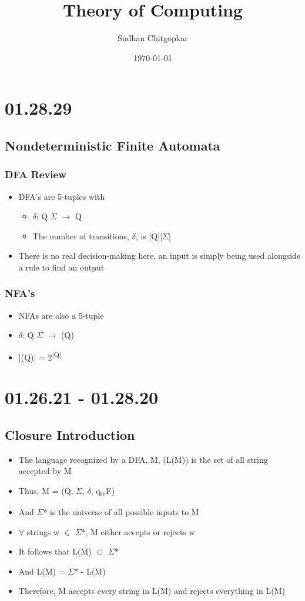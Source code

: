 \documentclass[11pt]{article}
\author{Sudhan Chitgopkar}
\date{\today}
\title{Theory of Computing}
\begin{document}
\maketitle
\tableofcontents \clearpage\section{01.28.29}
\label{sec:org62ebc56}
\subsection{Nondeterministic Finite Automata}
\label{sec:org2fa3076}
\subsubsection{DFA Review}
\label{sec:org348117a}
\begin{itemize}
\item DFA's are 5-tuples with
\begin{itemize}
\item \(\delta\): Q \texttimes{} \(\Sigma\) \(\to\) Q
\item The number of transitions, \(\delta\), is |Q||\(\Sigma\)|
\end{itemize}
\item There is no real decision-making here, an input is simply being used alongside a rule to find an output
\end{itemize}
\subsubsection{NFA's}
\label{sec:org0b276a4}
\begin{itemize}
\item NFAs are also a 5-tuple
\item \(\delta\): Q \texttimes{} \(\Sigma\) \(\to\) (Q)
\item |(Q)| = 2\textsuperscript{|Q|}
\end{itemize}
\section{01.26.21 - 01.28.20}
\label{sec:org1d8a6a3}
\subsection{Closure Introduction}
\label{sec:orgab49c93}
\begin{itemize}
\item The language recognized by a DFA, M, (L(M)) is the set of all string accepted by M
\item Thus, M = (Q, \(\Sigma\), \(\delta\), q\textsubscript{0},F)
\item And \(\Sigma\)* is the universe of all possible inputs to M
\item \(\forall\) strings w \(\in\) \(\Sigma\)*, M either accepts or rejects w
\item It follows that L(M) \(\subset\) \(\Sigma\)*
\item And \textlnot{} L(M) = \(\Sigma\)* - L(M)
\item Therefore, M accepts every string in L(M) and rejects everything in \textlnot{} L(M)
\end{itemize}
\end{document}
